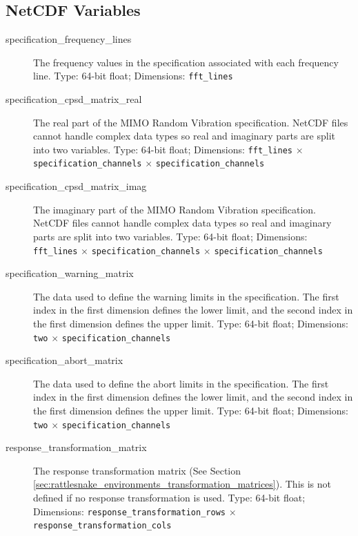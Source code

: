 \documentclass[pdf,12pt,report]{SANDreport}
\newcommand{\inlineCode}{\lstinline[basicstyle=\bfseries\ttfamily]}
\begin{document}
    \subsection{NetCDF Variables}
    \begin{description}
        \item[specification\_frequency\_lines] The frequency values in the specification associated with each frequency line.  Type: 64-bit float; Dimensions: \inlineCode{fft_lines}
        
        \item[specification\_cpsd\_matrix\_real] The real part of the \Ac{MIMO} Random Vibration specification.  NetCDF files cannot handle complex data types so real and imaginary parts are split into two variables.  Type: 64-bit float; Dimensions: \inlineCode{fft_lines} $\times$ \inlineCode{specification_channels} $\times$ \inlineCode{specification_channels}
        
        \item[specification\_cpsd\_matrix\_imag] The imaginary part of the \Ac{MIMO} Random Vibration specification.  NetCDF files cannot handle complex data types so real and imaginary parts are split into two variables.  Type: 64-bit float; Dimensions: \inlineCode{fft_lines} $\times$ \inlineCode{specification_channels} $\times$ \inlineCode{specification_channels}
        
        \item[specification\_warning\_matrix] The data used to define the warning limits in the specification.  The first index in the first dimension defines the lower limit, and the second index in the first dimension defines the upper limit. Type: 64-bit float; Dimensions: \inlineCode{two} $\times$ \inlineCode{specification_channels}
        
        \item[specification\_abort\_matrix] The data used to define the abort limits in the specification.  The first index in the first dimension defines the lower limit, and the second index in the first dimension defines the upper limit. Type: 64-bit float; Dimensions: \inlineCode{two} $\times$ \inlineCode{specification_channels}
        
        \item[response\_transformation\_matrix] The response transformation matrix (See Section \ref{sec:rattlesnake_environments_transformation_matrices}).  This is not defined if no response transformation is used.  Type: 64-bit float; Dimensions: \inlineCode{response_transformation_rows} $\times$ \inlineCode{response_transformation_cols}
        

\end{description}
\end{document}
